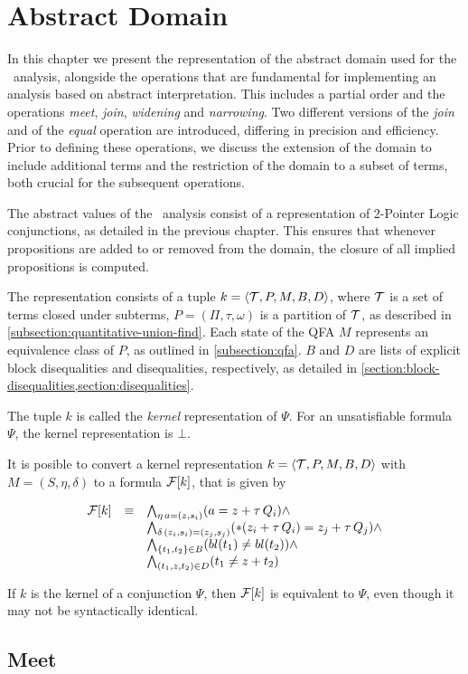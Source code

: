 \chapter{Abstract Domain}

In this chapter we present the representation of the abstract domain used for the \cpo\ analysis, alongside the operations that are fundamental for implementing an analysis based on abstract interpretation.
This includes a partial order and the operations \emph{meet}, \emph{join}, \emph{widening} and \emph{narrowing}.
Two different versions of the \emph{join} and of the \emph{equal} operation are introduced,
differing in precision and efficiency.
Prior to defining these operations, we discuss the extension of the domain to include additional terms and the restriction of the domain to a subset of terms,
both crucial for the subsequent operations.

The abstract values of the \cpo\ analysis consist of a representation
of 2-Pointer Logic conjunctions, as detailed in the previous chapter.
This ensures that whenever propositions are added to or removed from the domain,
the closure of all implied propositions is computed.

The representation consists of a tuple $k = \langle\mathcal{T},P,M,B,D\rangle$,
where $\mathcal{T}$ is a set of terms closed under subterms, $P = (\Pi, \tau, \omega)$ is a partition
of $\mathcal{T}$, as described in \cref{subsection:quantitative-union-find}.
Each state of the QFA $M$ represents an equivalence class of $P$, as outlined in \cref{subsection:qfa}.
$B$ and $D$ are lists of explicit block disequalities and disequalities, respectively, as detailed in \cref{section:block-disequalities,section:disequalities}.

The tuple $k$ is called the \emph{kernel} representation of $\Psi$.
For an unsatisfiable formula $\Psi$, the kernel representation is $\bot$.

It is posible to convert a kernel representation $k = \langle\mathcal{T},P,M,B,D\rangle$ with $M = (S, \eta, \delta)$ to a formula $\mathcal{F}[k]$, that is given by

\[
\begin{array}{lll}
    \mathcal{F}[k] & \equiv & \bigwedge_{\eta\,a=(z,s_i)} (a = z + \tau\,Q_i) \land \\
    & & \bigwedge_{\delta\,(z_i,s_i)=(z_j,s_j)} (*(z_i + \tau\,Q_i) = z_j + \tau\,Q_j) \land \\
    & & \bigwedge_{\{t_1, t_2\} \in B} (bl(t_1) \neq bl(t_2)) \land \\
    & & \bigwedge_{(t_1, z, t_2) \in D} (t_1 \neq z + t_2)
\end{array}
\]

If $k$ is the kernel of a conjunction $\Psi$, then $\mathcal{F}[k]$ is equivalent to $\Psi$,
even though it may not be syntactically identical.





\section{Meet}




